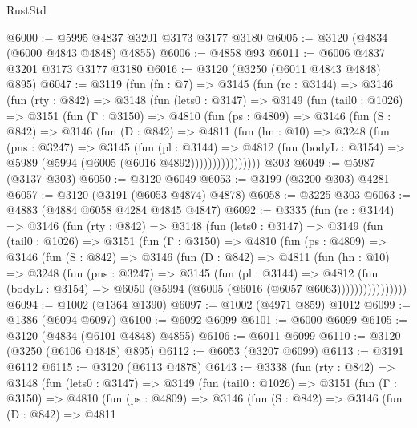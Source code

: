 \begin{lexlean}{RustStd}
\begin{coremodule}
{\begin{coremodule}
{{{{{{{{{{{{{{{{{{{{{{{{{{@6000 := @5995 @4837 @3201 @3173 @3177 @3180
@6005 := @3120 (@4834 (@6000 @4843 @4848) @4855)
@6006 := @4858 @93
@6011 := @6006 @4837 @3201 @3173 @3177 @3180
@6016 := @3120 (@3250 (@6011 @4843 @4848) @895)
@6047 := @3119
    (fun (fn : @7) =>
    @3145
      (fun (rc : @3144) =>
      @3146
        (fun (rty : @842) =>
        @3148
          (fun (lets0 : @3147) =>
          @3149
            (fun (tail0 : @1026) =>
            @3151
              (fun (Γ : @3150) =>
              @4810
                (fun (ps : @4809) =>
                @3146
                  (fun (S : @842) =>
                  @3146
                    (fun (D : @842) =>
                    @4811
                      (fun (hn : @10) =>
                      @3248
                        (fun (pns : @3247) =>
                        @3145
                          (fun (pl : @3144) =>
                          @4812
                            (fun (bodyL : @3154) => @5989 (@5994 (@6005 (@6016 @4892))))))))))))))))
    @303
@6049 := @5987 (@3137 @303)
@6050 := @3120 @6049
@6053 := @3199 (@3200 @303) @4281
@6057 := @3120 (@3191 (@6053 @4874) @4878)
@6058 := @3225 @303
@6063 := @4883 (@4884 @6058 @4284 @4845 @4847)
@6092 := @3335
    (fun (rc : @3144) =>
    @3146
      (fun (rty : @842) =>
      @3148
        (fun (lets0 : @3147) =>
        @3149
          (fun (tail0 : @1026) =>
          @3151
            (fun (Γ : @3150) =>
            @4810
              (fun (ps : @4809) =>
              @3146
                (fun (S : @842) =>
                @3146
                  (fun (D : @842) =>
                  @4811
                    (fun (hn : @10) =>
                    @3248
                      (fun (pns : @3247) =>
                      @3145
                        (fun (pl : @3144) =>
                        @4812
                          (fun (bodyL : @3154) =>
                          @6050 (@5994 (@6005 (@6016 (@6057 @6063))))))))))))))))
@6094 := @1002 (@1364 @1390)
@6097 := @1002 (@4971 @859) @1012
@6099 := @1386 (@6094 @6097)
@6100 := @6092 @6099
@6101 := @6000 @6099
@6105 := @3120 (@4834 (@6101 @4848) @4855)
@6106 := @6011 @6099
@6110 := @3120 (@3250 (@6106 @4848) @895)
@6112 := @6053 (@3207 @6099)
@6113 := @3191 @6112
@6115 := @3120 (@6113 @4878)
@6143 := @3338
    (fun (rty : @842) =>
    @3148
      (fun (lets0 : @3147) =>
      @3149
        (fun (tail0 : @1026) =>
        @3151
          (fun (Γ : @3150) =>
          @4810
            (fun (ps : @4809) =>
            @3146
              (fun (S : @842) =>
              @3146
                (fun (D : @842) =>
                @4811
}}}}}}}}}}}}}}}}}}}}}}}}}}
\end{coremodule}}
\end{coremodule}
\end{lexlean}
